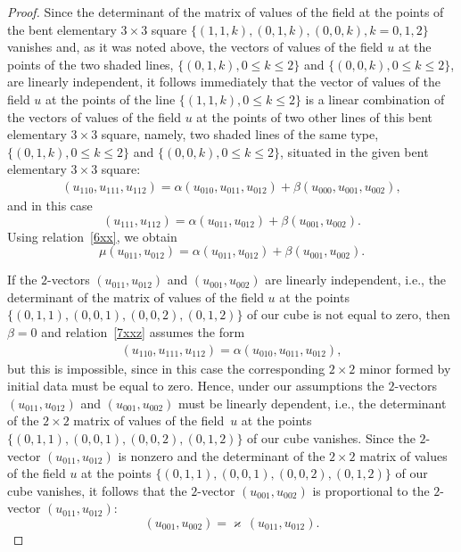 \documentclass[pdftex]{sigma}
\begin{document}
\begin{proof}
Since the determinant of the matrix of values of the f\/ield at the
points of the bent elementary $3 \times 3$ square $\{(1, 1, k), (0,
1, k), (0, 0, k), k = 0, 1, 2\}$ vanishes and, as it was noted
above, the vectors of values of the f\/ield $u$ at the points of the
two shaded lines, $\{(0, 1, k), 0 \leq k \leq 2\}$ and $\{(0, 0, k),
0 \leq k \leq 2\}$, are linearly independent, it follows immediately
that the vector of values of the f\/ield $u$ at the points of the line
$\{(1, 1, k), 0 \leq k \leq 2\}$ is a linear combination of the
vectors of values of the f\/ield $u$ at the points of two other lines
of this bent elementary $3 \times 3$ square, namely, two shaded
lines of the same type, $\{(0, 1, k), 0 \leq k \leq 2\}$ and $\{(0,
0, k), 0 \leq k \leq 2\}$, situated in the given bent elementary $3
\times 3$ square:
\begin{gather} (u_{1 1 0}, u_{1 1 1}, u_{1 1 2}) = \alpha (u_{0 1 0}, u_{0 1
1}, u_{0 1 2}) + \beta (u_{0 0 0}, u_{0 0 1}, u_{0 0 2}),
\label{7xxz}
\end{gather} and in this case \[ (u_{1 1 1}, u_{1 1 2}) =
\alpha (u_{0 1 1}, u_{0 1 2}) + \beta (u_{0 0 1}, u_{0 0 2}). \]
Using relation~\eqref{6xx}, we obtain \[ \mu (u_{0 1 1}, u_{0 1 2})
= \alpha (u_{0 1 1}, u_{0 1 2}) + \beta (u_{0 0 1}, u_{0 0 2}). \]


If the $2$-vectors $(u_{0 1 1}, u_{0 1 2})$ and $(u_{0 0 1}, u_{0 0
2})$ are linearly independent, i.e., the determinant of the matrix
of values of the f\/ield $u$ at the points $\{(0, 1, 1), (0, 0, 1),
(0, 0, 2), (0, 1, 2)\}$ of our cube is not equal to zero, then
$\beta = 0$ and relation~\eqref{7xxz} assumes the form
\begin{gather*} (u_{1 1
0}, u_{1 1 1}, u_{1 1 2}) = \alpha (u_{0 1 0}, u_{0 1 1}, u_{0 1
2}), %
\end{gather*} but this is impossible, since in this case the
corresponding $2 \times 2$ minor formed by initial data must be
equal to zero.
Hence, under our assumptions the $2$-vectors $(u_{0 1 1}, u_{0 1
2})$ and $(u_{0 0 1}, u_{0 0 2})$ must be linearly dependent, i.e.,
the determinant of the $2 \times 2$ matrix of values of the f\/ield~$u$ at the points $\{(0, 1, 1), (0, 0, 1), (0, 0, 2), (0, 1, 2)\}$
of our cube vanishes. Since the $2$-vector $(u_{0 1 1}, u_{0 1 2})$
is nonzero and the determinant of the $2 \times 2$ matrix of values
of the f\/ield $u$ at the points $\{(0, 1, 1), (0, 0, 1), (0, 0, 2),
(0, 1, 2)\}$ of our cube vanishes, it follows that the $2$-vector
$(u_{0 0 1}, u_{0 0 2})$ is proportional to the $2$-vector $(u_{0 1
1}, u_{0 1 2})$: \[ (u_{0 0 1}, u_{0 0 2}) = \varkappa \, (u_{0 1
1}, u_{0 1 2}). \]



\end{proof}
\end{document}
